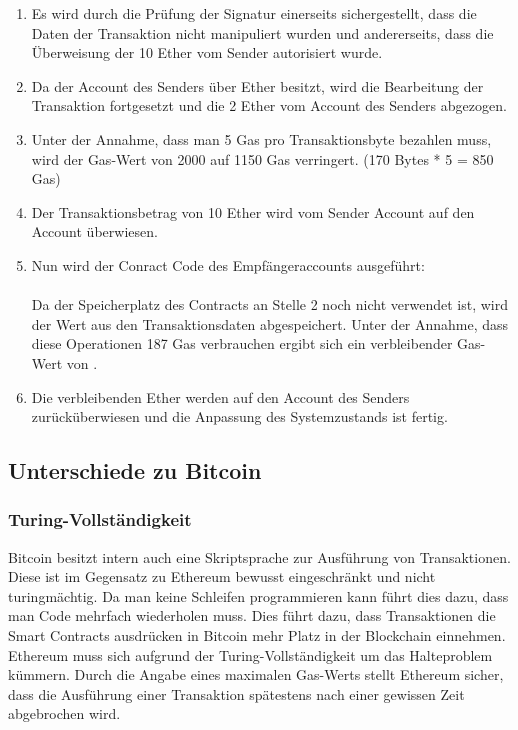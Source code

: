 \begin{enumerate}
\item Es wird durch die Prüfung der Signatur einerseits sichergestellt, dass die Daten der Transaktion nicht manipuliert wurden und andererseits, dass die Überweisung der 10 Ether vom Sender autorisiert wurde. 
\item Da der Account des Senders über  Ether besitzt, wird die Bearbeitung der Transaktion fortgesetzt und die 2 Ether vom Account des Senders abgezogen.
\item Unter der Annahme, dass man 5 Gas pro Transaktionsbyte bezahlen muss, wird der Gas-Wert von 2000 auf 1150 Gas verringert. (170 Bytes * 5 = 850 Gas) 
\item Der Transaktionsbetrag von 10 Ether wird vom Sender Account  auf den Account  überwiesen.
\item Nun wird der Conract Code des Empfängeraccounts ausgeführt:\\ \\
Da der Speicherplatz des Contracts an Stelle 2 noch nicht verwendet ist, wird  der Wert  aus den Transaktionsdaten abgespeichert. Unter der Annahme, dass diese Operationen 187 Gas verbrauchen ergibt sich ein verbleibender Gas-Wert von . 
\item Die verbleibenden  Ether werden auf den Account des Senders zurücküberwiesen und die Anpassung des Systemzustands ist fertig.
\end{enumerate}

\subsection{Unterschiede zu Bitcoin}\label{eth_grundlagen_btc_diff} 
\subsubsection{Turing-Vollständigkeit}
Bitcoin besitzt intern auch eine Skriptsprache zur Ausführung von Transaktionen. Diese ist im Gegensatz zu Ethereum bewusst eingeschränkt und nicht turingmächtig. Da man keine Schleifen programmieren kann führt dies dazu, dass man Code mehrfach wiederholen muss. Dies führt dazu, dass Transaktionen die Smart Contracts ausdrücken in Bitcoin mehr Platz in der Blockchain einnehmen. Ethereum muss sich aufgrund der Turing-Vollständigkeit um das Halteproblem kümmern. Durch die Angabe eines maximalen Gas-Werts stellt Ethereum sicher, dass die Ausführung einer Transaktion spätestens nach einer gewissen Zeit abgebrochen wird. 
